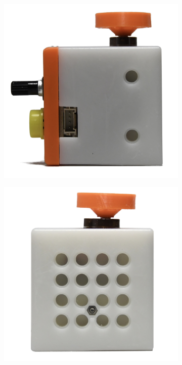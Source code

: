 \begin{figure}[H]
\begin{subfigure}[b]{0.25\textwidth}
    \end{subfigure}
    \\\vspace{2pt}
    \begin{subfigure}[b]{0.25\textwidth}
        \includegraphics[width=\linewidth]{overleaf/images/sm_right.jpg}
    \end{subfigure}
    \begin{subfigure}[b]{0.25\textwidth}
        \includegraphics[width=\linewidth]{overleaf/images/sm_back.jpg}

\end{subfigure}
\end{figure}
